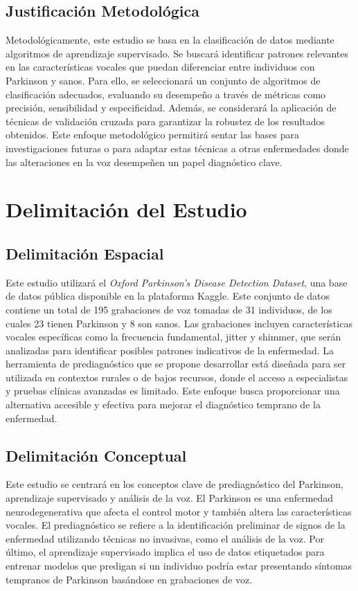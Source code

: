 \documentclass[listof=nochaptergap,12pt,times,authoryear]{report}
\begin{document}
\subsection{Justificación Metodológica}
Metodológicamente, este estudio se basa en la clasificación de datos mediante algoritmos de aprendizaje supervisado. Se buscará identificar patrones relevantes en las características vocales que puedan diferenciar entre individuos con Parkinson y sanos. Para ello, se seleccionará un conjunto de algoritmos de clasificación adecuados, evaluando su desempeño a través de métricas como precisión, sensibilidad y especificidad. Además, se considerará la aplicación de técnicas de validación cruzada para garantizar la robustez de los resultados obtenidos. Este enfoque metodológico permitirá sentar las bases para investigaciones futuras o para adaptar estas técnicas a otras enfermedades donde las alteraciones en la voz desempeñen un papel diagnóstico clave.

\section{Delimitación del Estudio}
\subsection{Delimitación Espacial}
Este estudio utilizará el \textit{Oxford Parkinson's Disease Detection Dataset}, una base de datos pública disponible en la plataforma Kaggle. Este conjunto de datos contiene un total de 195 grabaciones de voz tomadas de 31 individuos, de los cuales 23 tienen Parkinson y 8 son sanos. Las grabaciones incluyen características vocales específicas como la frecuencia fundamental, jitter y shimmer, que serán analizadas para identificar posibles patrones indicativos de la enfermedad. La herramienta de prediagnóstico que se propone desarrollar está diseñada para ser utilizada en contextos rurales o de bajos recursos, donde el acceso a especialistas y pruebas clínicas avanzadas es limitado. Este enfoque busca proporcionar una alternativa accesible y efectiva para mejorar el diagnóstico temprano de la enfermedad.


\subsection{Delimitación Conceptual}
Este estudio se centrará en los conceptos clave de prediagnóstico del Parkinson, aprendizaje supervisado y análisis de la voz. El Parkinson es una enfermedad neurodegenerativa que afecta el control motor y también altera las características vocales. El prediagnóstico se refiere a la identificación preliminar de signos de la enfermedad utilizando técnicas no invasivas, como el análisis de la voz. Por último, el aprendizaje supervisado implica el uso de datos etiquetados para entrenar modelos que predigan si un individuo podría estar presentando síntomas tempranos de Parkinson basándose en grabaciones de voz.
\end{document}
